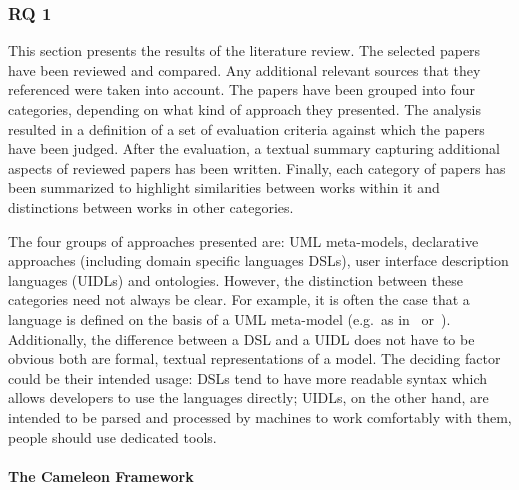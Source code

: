 \subsubsection{RQ 1}\label{subsubsec:rq-1}

This section presents the results of the literature review.
The selected papers have been reviewed and compared.
Any additional relevant sources that they referenced were taken into account.
The papers have been grouped into four categories, depending on what kind of approach they presented.
The analysis resulted in a definition of a set of evaluation criteria against which the papers have been judged.
After the evaluation, a textual summary capturing additional aspects of reviewed papers has been written.
Finally, each category of papers has been summarized to highlight similarities between works within it and distinctions between works in other categories.

The four groups of approaches presented are: UML meta-models, declarative approaches (including domain specific languages\,\textemdash\,DSLs), user interface description languages (UIDLs) and ontologies.
However, the distinction between these categories need not always be clear.
For example, it is often the case that a language is defined on the basis of a UML meta-model (e.g.\ as in~\cite{Karu2013-po} or~\cite{moldovan2020open}).
Additionally, the difference between a DSL and a UIDL does not have to be obvious\,\textemdash\,both are formal, textual representations of a model.
The deciding factor could be their intended usage: DSLs tend to have more readable syntax which allows developers to use the languages directly;
UIDLs, on the other hand, are intended to be parsed and processed by machines\,\textemdash\,to work comfortably with them, people should use dedicated tools.

\paragraph{The Cameleon Framework}

